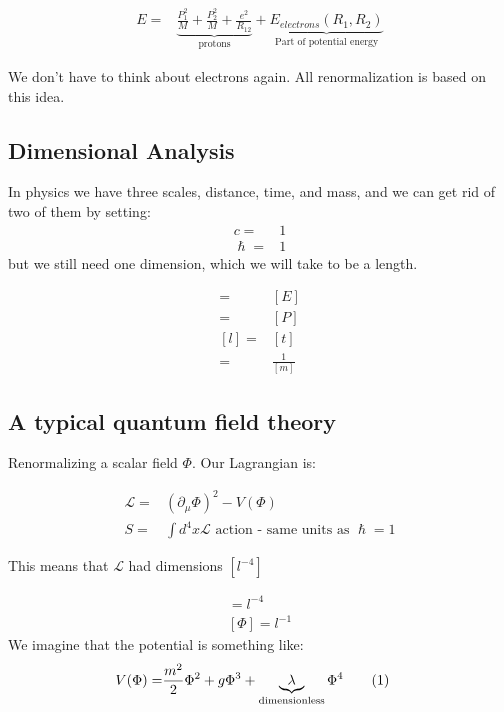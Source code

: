 \documentclass[]{article}
\newcommand\numberthis{\addtocounter{equation}{1}\tag{\theequation}}
\begin{document}
\begin{align*}
E=& \underbrace{\frac{P_1^2}{M} + \frac{P_2^2}{M} + \frac{e^2}{R_{12}}}_\text{protons} +\underbrace{ E_{electrons}(R_1,R_2)}_\text{Part of potential energy}
\end{align*}

We don't have to think about electrons again. All renormalization is based on this idea. 

\subsection{Dimensional Analysis}

In physics we have three scales, distance, time, and mass, and we can get rid of two of them by setting:
\begin{align*}
	c=&1\\
	\hslash=& 1
\end{align*} 
but we still need one dimension, which we will take to be a length.

\begin{align*}
	[m] =& [E]\\
	=& [P]\\
	[l] =& [t]\\
	=& \frac{1}{[m]}
\end{align*}

\subsection{A typical quantum field theory}

Renormalizing a scalar field $\Phi$. Our Lagrangian is:

\begin{align*}
	\mathcal{L} =& (\partial_\mu \Phi)^2 - V(\Phi)\\
	S =& \int d^4 x \mathcal{L} \text{ action - same units as $\hslash=1$}
\end{align*}

This means that $\mathcal{L}$ had dimensions $[l^{-4}]$

\begin{align*}
	[(\frac{\partial \Phi}{\partial x})^2]=l^{-4}\\
	[\Phi] = l^{-1}
\end{align*}
We imagine that the potential is something like:
\begin{align*}
	V(\Phi) =& \frac{m^2}{2} \Phi^2 + g \Phi^3 + \underbrace{\lambda}_\text{dimensionless} \Phi^4 \numberthis \label{eq:potential}
\end{align*}
\end{document}
